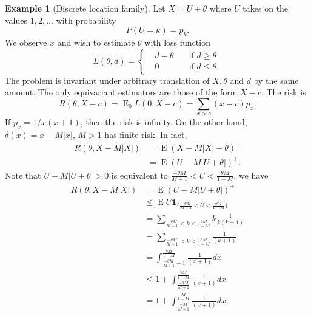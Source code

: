 \documentclass{article}
\DeclareMathOperator{\myE}{E}
\theoremstyle{plain}
\theoremstyle{definition}
\newtheorem{example}{Example}
\begin{document}
\begin{example}[Discrete location family]
Let $X=U+\theta$ where $U$ takes on the values $1,2,\ldots$ with probability
    \begin{equation*}
        P(U=k)=p_k.
    \end{equation*}
    We observe $x$ and wish to estimate $\theta$ with loss function
    \begin{equation*}
        L(\theta,d)=\left\{
            \begin{aligned}
                &d-\theta \quad& \textrm{if $d\geq \theta$}\\
                &0 \quad& \textrm{if $d\leq \theta$}.
            \end{aligned}
            \right.
    \end{equation*}
    The problem is invariant under arbitrary translation of $X,\theta$ and $d$ by the same amount.
    The only equivariant estimators are those of the form $X-c$. The risk is
    \begin{equation*}
        R(\theta,X-c)=
        \myE_0 L(0,X-c)=\sum_{x>c} (x-c)p_x.
    \end{equation*}
    If $p_x=1/x(x+1)$, then the risk is infinity. On the other hand, $\delta(x)=x-M|x|$, $M>1$ has finite risk. In fact,
    \begin{equation*}
        \begin{aligned}
            R(\theta,X-M|X|)&=
        \myE(X-M|X|-\theta)^+\\
            &=
        \myE(U-M|U+\theta|)^+.
        \end{aligned}
    \end{equation*}
    Note that $U-M|U+\theta|>0$ is equivalent to $\frac{-\theta M }{M+1}<U<\frac{\theta M}{1-M}$, we have
    \begin{equation*}
        \begin{aligned}
            R(\theta,X-M|X|)&=
        \myE(U-M|U+\theta|)^+\\
            &\leq \myE U\mathbf{1}_{\{\frac{-\theta M }{M+1}<U<\frac{\theta M}{1-M}\}}\\
            &=\sum_{\frac{-\theta M }{M+1}<k<\frac{\theta M}{1-M}}k\frac{1}{k(k+1)}\\
            &=\sum_{\frac{-\theta M }{M+1}<k<\frac{\theta M}{1-M}}\frac{1}{(k+1)}\\
            &=\int_{\frac{-\theta M }{M+1}-1}^{\frac{\theta M}{1-M}}\frac{1}{(x+1)}dx\\
            &\leq 1+\int_{\frac{-\theta M }{M+1}}^{\frac{\theta M}{1-M}}\frac{1}{(x+1)}dx\\
            &= 1+\int_{\frac{- M }{M+1}}^{\frac{ M}{1-M}}\frac{1}{(x+1)}dx.
        \end{aligned}
    \end{equation*}

\end{example}
\end{document}
